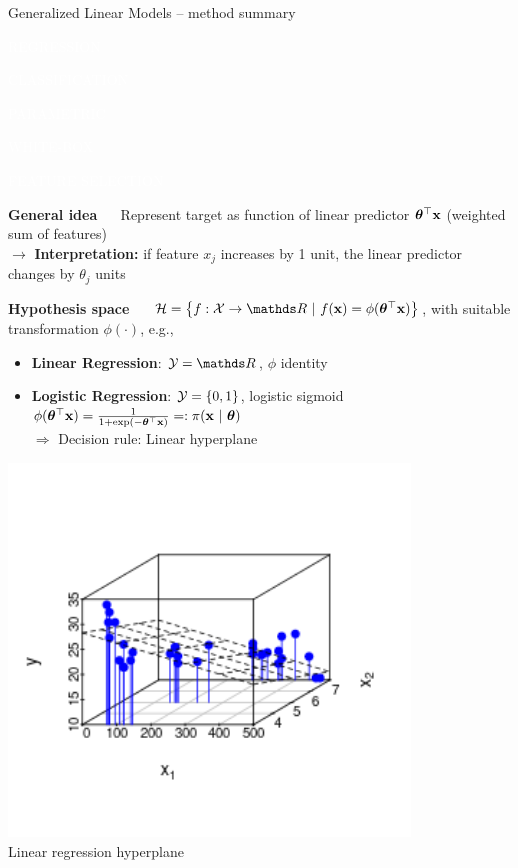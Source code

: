 \documentclass[11pt,compress,t,notes=noshow, xcolor=table]{beamer}
\newcommand{\highlight}[1]{\textcolor{hlcol}{\textbf{#1}}}
\newcommand{\maketag}[2][100]{
  \colorbox{hlcol!#1}{\textcolor{white}{\MakeUppercase{\scriptsize #2}} 
  \vphantom{}}
}
\begin{document}
\begin{vbframe}{Generalized Linear Models -- method summary}
  \maketag{regression} \maketag{classification} \maketag{PARAMETRIC} 
\maketag{WHITE-BOX} \maketag[50]{Feature selection}
\medskip

\highlight{General idea} ~~ Represent target as function of linear predictor
$\bm{\theta}^\top \mathbf{x}$ (weighted sum of features)\\
$\rightarrow$ \textbf{Interpretation:} if feature $x_j$ increases by 1 unit, the linear predictor changes by $\theta_j$ units


\medskip

\highlight{Hypothesis space} ~~
$\Hspace = \left\{f: \Xspace \to \R ~|~\fx = \phi(\thetav^\top \xv)\right\}$, 
with suitable transformation $\phi(\cdot)$, e.g.,

\begin{itemize}
  \item \textbf{Linear Regression}: $\Yspace = \R$, $\phi$ identity
  \item \textbf{Logistic Regression}: $\mathcal{Y} = \{0, 1\}$, logistic sigmoid $\phi(\bm{\theta}^\top \mathbf{x}) = \frac{1}{1 + \exp(- \bm{\theta}^\top \mathbf{x})} 
  =: \pi(\mathbf{x}~|~ \bm{\theta})$\\
  $\Rightarrow$ Decision rule: Linear hyperplane
\end{itemize}
\begin{minipage}[b]{0.24\textwidth}
  \begin{center}
    \includegraphics[width=0.8\textwidth, trim=0 40 0 0, clip]{
    figure/lm_3d.png} \\
    \tiny{Linear regression hyperplane}
  \end{center}

\end{minipage}
\end{vbframe}
\end{document}
